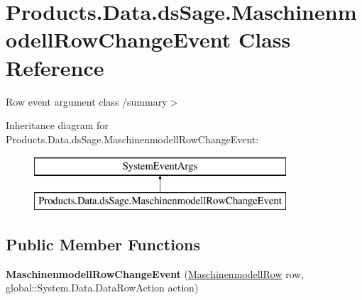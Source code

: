 \hypertarget{class_products_1_1_data_1_1ds_sage_1_1_maschinenmodell_row_change_event}{}\section{Products.\+Data.\+ds\+Sage.\+Maschinenmodell\+Row\+Change\+Event Class Reference}
\label{class_products_1_1_data_1_1ds_sage_1_1_maschinenmodell_row_change_event}


Row event argument class /summary$>$  


Inheritance diagram for Products.\+Data.\+ds\+Sage.\+Maschinenmodell\+Row\+Change\+Event\+:\begin{figure}[H]
\begin{center}
\leavevmode
\includegraphics[height=2.000000cm]{class_products_1_1_data_1_1ds_sage_1_1_maschinenmodell_row_change_event}
\end{center}
\end{figure}
\subsection*{Public Member Functions}
\begin{DoxyCompactItemize}
\item 
{\bfseries Maschinenmodell\+Row\+Change\+Event} (\hyperlink{class_products_1_1_data_1_1ds_sage_1_1_maschinenmodell_row}{Maschinenmodell\+Row} row, global\+::\+System.\+Data.\+Data\+Row\+Action action)\hypertarget{class_products_1_1_data_1_1ds_sage_1_1_maschinenmodell_row_change_event_aefbaab62161efd9c5c58c0cda3fcb6db}{}\label{class_products_1_1_data_1_1ds_sage_1_1_maschinenmodell_row_change_event_aefbaab62161efd9c5c58c0cda3fcb6db}

\end{DoxyCompactItemize}
